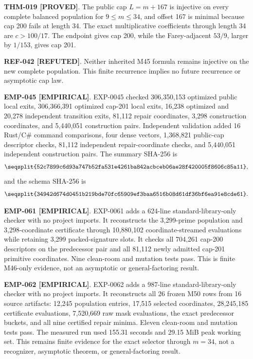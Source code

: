 \documentclass[11pt]{article}
\newcommand{\claimstatus}[2]{\textbf{#1 [#2]}}
\begin{document}
\claimstatus{THM-019}{PROVED}. The public cap \(L=m+167\) is injective on
every complete balanced population for \(9\le m\le34\), and offset 167 is
minimal because cap 200 fails at length 34. The exact multiplicative
coefficients through length 34 are \(c>100/17\). The endpoint gives cap 200,
while the Farey-adjacent \(53/9\), larger by \(1/153\), gives cap 201.

\claimstatus{REF-042}{REFUTED}. Neither inherited M45 formula remains
injective on the new complete population. This finite recurrence implies no
future recurrence or asymptotic cap law.

\claimstatus{EMP-045}{EMPIRICAL}. EXP-0045 checked 306,350,153 optimized
public local exits, 306,366,391 optimized cap-201 local exits, 16,238
optimized and 20,278 independent transition exits, 81,112 repair
coordinates, 3,298 construction coordinates, and 5,440,051 construction
pairs. Independent validation added 16 Rust/C\# command comparisons, four
dense vectors, 1,368,821 public-cap descriptor checks, 81,112 independent
repair-coordinate checks, and 5,440,051 independent construction pairs. The
summary SHA-256 is
\[
\texttt{\seqsplit{52c7899c6d93a747b52fa531e4261ba842acbceb06ae28f420005f8606c85a11}},
\]
and the schema SHA-256 is
\[
\texttt{\seqsplit{34942d674d0451b219bde70fc65909ef3baa6516b08d61df36bf6ea91e8cde61}}.
\]

\claimstatus{EMP-061}{EMPIRICAL}. EXP-0061 adds a 624-line
standard-library-only checker with no project imports. It reconstructs the
3,299-prime population and 3,298-coordinate certificate through 10,880,102
coordinate-streamed evaluations while retaining 3,299 packed-signature
slots. It checks all 704,261 cap-200 descriptors on the predecessor pair and
all 81,112 newly admitted cap-201 primitive coordinates. Nine clean-room and
mutation tests pass. This is finite M46-only evidence, not an asymptotic or
general-factoring result.

\claimstatus{EMP-062}{EMPIRICAL}. EXP-0062 adds a 987-line
standard-library-only checker with no project imports. It reconstructs all 26
frozen M50 rows from 16 source artifacts: 12,245 population entries, 17,515
selected coordinates, 28,245,185 certificate evaluations, 7,520,669 raw mask
evaluations, the exact predecessor buckets, and all nine certified repair
minima. Eleven clean-room and mutation tests pass. The measured run used
155.31 seconds and 29.15 MiB peak working set. This remains finite evidence
for the exact selector through \(m=34\), not a recognizer, asymptotic theorem,
or general-factoring result.
\end{document}
